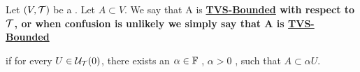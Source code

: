 \label{def:topologicalvectorspaceboundedset}
\newcommand{\TVSBounded}[0]{
    \bf \hyperref[def:topologicalvectorspaceboundedset]{TVS-Bounded} \rm
}

\begin{df}
Let $(V,\mathcal{T})$ be a 
\TVS.
Let $A \subset V$. 
We say that A is \TVSBounded with respect to $\mathcal{T}$,
or when confusion is unlikely we simply say that A is \TVSBounded
if for every $U \in \mathcal{U}_{\mathcal{T}}(0)$, there exists an $\alpha \in \mathbb{F}$
, $\alpha > 0$
, such that $A \subset \alpha U$. 
\end{df}
